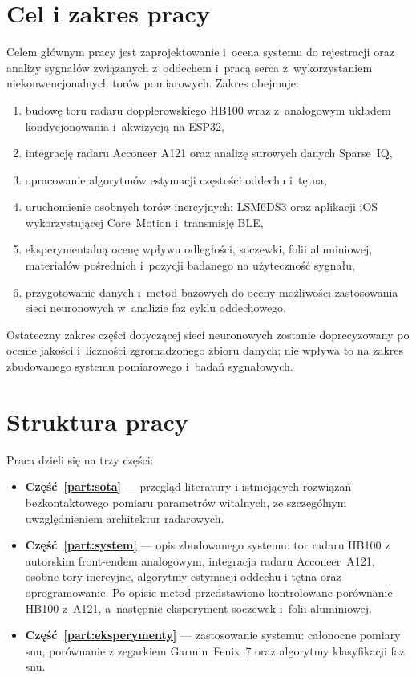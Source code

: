 \documentclass[12pt,a4paper,oneside]{report}
\begin{document}
\section{Cel i zakres pracy}
Celem głównym pracy jest zaprojektowanie i~ocena systemu do rejestracji oraz
analizy sygnałów związanych z~oddechem i~pracą serca z~wykorzystaniem
niekonwencjonalnych torów pomiarowych. Zakres obejmuje:
\begin{enumerate}
  \item budowę toru radaru dopplerowskiego HB100 wraz z~analogowym układem
  kondycjonowania i~akwizycją na ESP32,
  \item integrację radaru Acconeer A121 oraz analizę surowych danych Sparse~IQ,
  \item opracowanie algorytmów estymacji częstości oddechu i~tętna,
  \item uruchomienie osobnych torów inercyjnych: LSM6DS3 oraz aplikacji iOS
  wykorzystującej Core~Motion i~transmisję BLE,
  \item eksperymentalną ocenę wpływu odległości, soczewki, folii aluminiowej,
  materiałów pośrednich i~pozycji badanego na użyteczność sygnału,
  \item przygotowanie danych i~metod bazowych do oceny możliwości zastosowania
  sieci neuronowych w~analizie faz cyklu oddechowego.
\end{enumerate}
Ostateczny zakres części dotyczącej sieci neuronowych zostanie doprecyzowany po
ocenie jakości i~liczności zgromadzonego zbioru danych; nie wpływa to na zakres
zbudowanego systemu pomiarowego i~badań sygnałowych.

\section{Struktura pracy}
Praca dzieli się na trzy części:
\begin{itemize}
  \item \textbf{Część~\ref{part:sota}} --- przegląd literatury i istniejących
  rozwiązań bezkontaktowego pomiaru parametrów witalnych, ze szczególnym
  uwzględnieniem architektur radarowych.
  \item \textbf{Część~\ref{part:system}} --- opis zbudowanego systemu: tor
  radaru HB100 z autorskim front-endem analogowym, integracja radaru
  Acconeer~A121, osobne tory inercyjne, algorytmy estymacji oddechu i tętna
  oraz oprogramowanie. Po opisie metod przedstawiono kontrolowane porównanie
  HB100 z~A121, a~następnie eksperyment soczewek i~folii aluminiowej.
  \item \textbf{Część~\ref{part:eksperymenty}} --- zastosowanie systemu:
  całonocne pomiary snu, porównanie z zegarkiem Garmin~Fenix~7 oraz algorytmy
  klasyfikacji faz snu.
\end{itemize}
\end{document}
